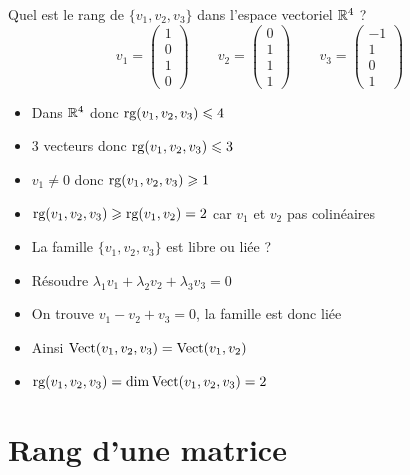 \begin{frame}
\begin{exemple}
Quel est le rang de $\{v_1,v_2,v_3\}$ dans l'espace vectoriel $\mathbb{R}^4$ ?
$$
v_1 = \left(\begin{smallmatrix} 1\\0\\1\\0 \end{smallmatrix}\right) \qquad
v_2 = \left(\begin{smallmatrix} 0\\1\\1\\1 \end{smallmatrix}\right) \qquad
v_3 = \left(\begin{smallmatrix} -1\\1\\0\\1 \end{smallmatrix}\right)$$
\vspace*{-2ex}
\pause
\begin{itemize}[<+->]
  \item Dans $\mathbb{R}^4$ donc $\mathop{\text{rg}}\nolimits(v_1,v_2,v_3) \leqslant 4$
  \item $3$ vecteurs donc $\mathop{\text{rg}}\nolimits(v_1,v_2,v_3) \leqslant 3$
  \item $v_1 \neq 0$ donc $\mathop{\text{rg}}\nolimits(v_1,v_2,v_3) \geqslant 1$
  \item  $\mathop{\text{rg}}\nolimits(v_1,v_2,v_3) \geqslant \mathop{\text{rg}}\nolimits(v_1,v_2)=2$ car $v_1$ et $v_2$ pas colinéaires
  \item La famille $\{v_1,v_2,v_3\}$ est libre ou liée ?
  \item Résoudre $\lambda_1 v_1 + \lambda_2 v_2 + \lambda_3 v_3 = 0$
  \item On trouve $v_1-v_2+v_3=0$, la famille est donc liée
  \item Ainsi $\mathop{\text{Vect}}\nolimits(v_1,v_2,v_3)= \mathop{\text{Vect}}\nolimits(v_1,v_2)$
  \item $\mathop{\text{rg}}\nolimits (v_1,v_2,v_3) = \dim \mathop{\text{Vect}}\nolimits(v_1,v_2,v_3) = 2$
\end{itemize}

\end{exemple}
\end{frame}


\section{Rang d'une matrice}

